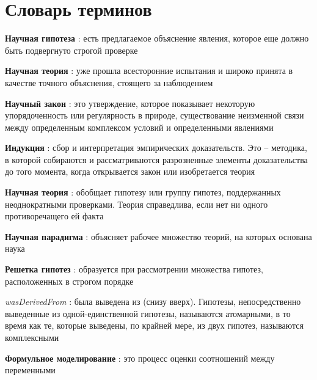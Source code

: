 \chapter*{Словарь терминов}             %

\textbf{Научная гипотеза} : есть предлагаемое объяснение явления, которое еще должно быть подвергнуто строгой проверке 

\textbf{Научная теория} : уже прошла всесторонние испытания и широко принята в качестве точного объяснения, стоящего за наблюдением

\textbf{Научный закон} : это утверждение, которое показывает некоторую упорядоченность или регулярность в природе, существование неизменной связи между определенным комплексом условий и определенными явлениями

\textbf{Индукция} : сбор и интерпретация эмпирических доказательств. Это – методика, в которой собираются и рассматриваются разрозненные элементы доказательства до того момента, когда открывается закон или изобретается теория

\textbf{Научная теория} : обобщает гипотезу или группу гипотез, поддержанных неоднократными проверками. Теория справедлива, если нет ни одного противоречащего ей факта

\textbf{Научная парадигма} : объясняет рабочее множество теорий, на которых основана наука

\textbf{Решетка гипотез} : образуется при рассмотрении множества гипотез, расположенных в строгом порядке 

\textit{wasDerivedFrom} : была выведена из (снизу вверх). Гипотезы, непосредственно выведенные из одной-единственной гипотезы, называются атомарными, в то время как те, которые выведены, по крайней мере, из двух гипотез, называются комплексными

\textbf{Формульное моделирование} : это процесс оценки соотношений между переменными